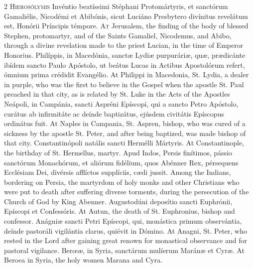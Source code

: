\begin{paracol}{2}
\lettrine[lines=2]{H}{ierosólymis} Invéntio 
 beatíssimi Stéphani Protomártyris, et sanctórum Gamaliélis, Nicodémi et 
 Abibónis, sicut Luciáno Presbytero divínitus revelátum est, Honórii 
 Príncipis témpore.
\switchcolumn
{}
\lettrine[lines=2]{A}{t} Jerusalem, the finding of the 
 body of blessed Stephen, protomartyr, and of the Saints Gamaliel, Nicodemus, 
 and Abibo, through a divine revelation made to the priest Lucian, in the 
 time of Emperor Honorius.
\switchcolumn*
{}
Philíppis, in 
 Macedónia, sanctæ Lydiæ purpuráriæ, quæ, prædicánte ibídem sancto Paulo 
 Apóstolo, ut beátus Lucas in Actibus Apostolórum refert, ómnium prima 
 crédidit Evangélio.
\switchcolumn
{}
At Philippi in Macedonia, St. Lydia, a dealer in purple, 
 who was the first to believe in the Gospel when the apostle St. Paul 
 preached in that city, as is related by St. Luke in the Acts of the Apostles
\switchcolumn*
{}
Neápoli, in Campánia, sancti Aspréni Epíscopi, qui a sancto Petro Apóstolo, curátus ab infirmitáte 
 ac deínde baptizátus, ejúsdem civitátis Epíscopus ordinátus fuit.
\switchcolumn
{}
At Naples in Campania, St. Aspren, 
 bishop, who was cured of a sickness by the apostle St. Peter, and after 
 being baptized, was made bishop of that city.
\switchcolumn*
{}
Constantinópoli natális 
 sancti Hermélli Mártyris.
\switchcolumn
{}
At Constantinople, the birthday of 
 St. Hermellus, martyr.
\switchcolumn*
{}
Apud Indos, Persis 
 finítimos, pássio sanctórum Monachórum, et aliórum fidélium, quos Abénner 
 Rex, pérsequens Ecclésiam Dei, divérsis afflíctos supplíciis, cædi jussit.
\switchcolumn
{}
Among the Indians, bordering on 
 Persia, the martyrdom of holy monks and other Christians who were put to 
 death after suffering diverse torments, during the persecution of the Church 
 of God by King Abenner.
\switchcolumn*
{}
Augustodúni deposítio 
 sancti Euphrónii, Epíscopi et Confessóris.
\switchcolumn
{}
At Autun, the death of St. 
 Euphronius, bishop and confessor.
\switchcolumn*
{}
Anágniæ sancti Petri 
 Epíscopi, qui, monástica primum observántia, deínde pastoráli vigilántia 
 clarus, quiévit in Dómino.
\switchcolumn
{}
At Anagni, St. Peter, who rested in 
 the Lord after gaining great renown for monastical observance and for 
 pastoral vigilance.
\switchcolumn*
{}
Berœæ, in Syria, 
 sanctárum mulíerum Maránæ et Cyræ.
\switchcolumn
{}
At Beroea in Syria, the holy women 
 Marana and Cyra.
\switchcolumn*
{}
\end{paracol}



